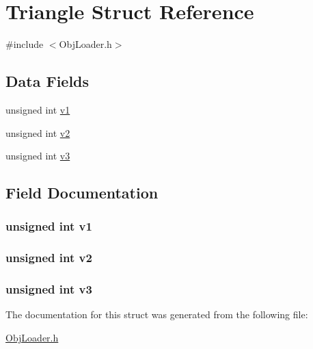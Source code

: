 \hypertarget{struct_triangle}{\section{Triangle Struct Reference}
\label{struct_triangle}
}


{\ttfamily \#include $<$Obj\-Loader.\-h$>$}

\subsection*{Data Fields}
\begin{DoxyCompactItemize}
\item 
unsigned int \hyperlink{struct_triangle_af71ef1f6506eba34854b68ca619e79dc}{v1}
\item 
unsigned int \hyperlink{struct_triangle_a54da0c7d5501c25a861a1ccad9a656e0}{v2}
\item 
unsigned int \hyperlink{struct_triangle_a7319cceb80d4104d0f7614ef9f86a849}{v3}
\end{DoxyCompactItemize}


\subsection{Field Documentation}
\hypertarget{struct_triangle_af71ef1f6506eba34854b68ca619e79dc}{
\subsubsection[{v1}]{\setlength{\rightskip}{0pt plus 5cm}unsigned int v1}}\label{struct_triangle_af71ef1f6506eba34854b68ca619e79dc}
\hypertarget{struct_triangle_a54da0c7d5501c25a861a1ccad9a656e0}{
\subsubsection[{v2}]{\setlength{\rightskip}{0pt plus 5cm}unsigned int v2}}\label{struct_triangle_a54da0c7d5501c25a861a1ccad9a656e0}
\hypertarget{struct_triangle_a7319cceb80d4104d0f7614ef9f86a849}{
\subsubsection[{v3}]{\setlength{\rightskip}{0pt plus 5cm}unsigned int v3}}\label{struct_triangle_a7319cceb80d4104d0f7614ef9f86a849}


The documentation for this struct was generated from the following file\-:\begin{DoxyCompactItemize}
\item 
\hyperlink{_obj_loader_8h}{Obj\-Loader.\-h}\end{DoxyCompactItemize}
